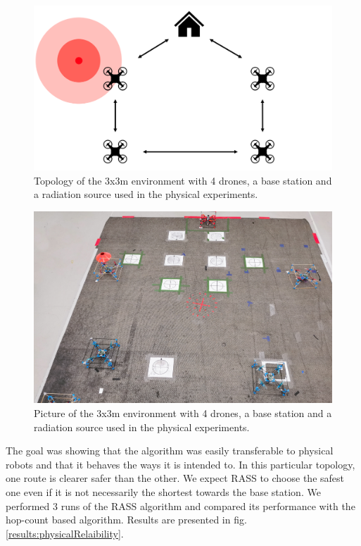 \begin{figure}[htbp]
	\centering
    \includegraphics[width=0.7\columnwidth]{images/physical-topology.png}
    \caption{Topology of the 3x3m environment with 4 drones, a base station and a radiation source used in the physical experiments.}
    \label{cogniflyExperiment1}
\end{figure}

\begin{figure}[htbp]
	\centering
    \includegraphics[width=0.64\columnwidth]{images/cognifly.jpg}
    \caption{Picture of the 3x3m environment with 4 drones, a base station and a radiation source used in the physical experiments.}
    \label{cogniflyExperiment2}
\end{figure}

The goal was showing that the algorithm was easily transferable to physical robots and that it behaves the ways it is intended to. In this particular topology, one route is clearer safer than the other. We expect RASS to choose the safest one even if it is not necessarily the shortest towards the base station. We performed 3 runs of the RASS algorithm and compared its performance with the hop-count based algorithm. Results are presented in fig. \ref{results:physicalRelaibility}.

